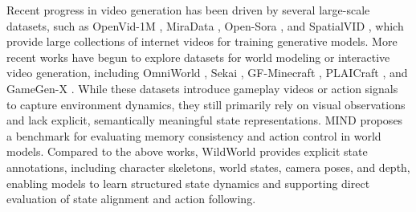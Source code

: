 Recent progress in video generation has been driven by several large-scale datasets, such as OpenVid-1M \cite{nan2024openvid}, MiraData \cite{ju2024miradata}, Open-Sora \cite{lin2024open}, and SpatialVID \cite{spatialvid}, which provide large collections of internet videos for training generative models. 
More recent works have begun to explore datasets for world modeling or interactive video generation, including OmniWorld \cite{zhou2025omniworld}, Sekai \cite{sekai}, GF-Minecraft \cite{yu2025gamefactory}, PLAICraft \cite{he2025plaicraft}, and GameGen-X \cite{che2024gamegen}.
While these datasets introduce gameplay videos or action signals to capture environment dynamics, they still primarily rely on visual observations and lack explicit, semantically meaningful state representations.
MIND \cite{ye2026mind} proposes a benchmark for evaluating memory consistency and action control in world models.
Compared to the above works, WildWorld provides explicit state annotations, including character skeletons, world states, camera poses, and depth, enabling models to learn structured state dynamics and supporting direct evaluation of state alignment and action following.
